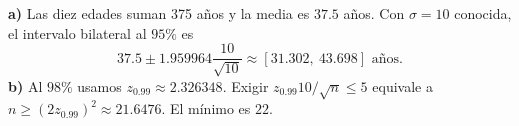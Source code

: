 \textbf{a)} Las diez edades suman 375 años y la media es
$37.5$ años. Con $\sigma=10$ conocida, el intervalo bilateral
al $95\%$ es
\[
37.5\pm1.959964\frac{10}{\sqrt{10}}
\approx\boxed{[31.302,\ 43.698]\text{ años}}.
\]
\textbf{b)} Al $98\%$ usamos $z_{0.99}\approx2.326348$.
Exigir $z_{0.99}10/\sqrt n\le5$ equivale a
$n\ge(2z_{0.99})^2\approx21.6476$. El mínimo es $\boxed{22}$.
